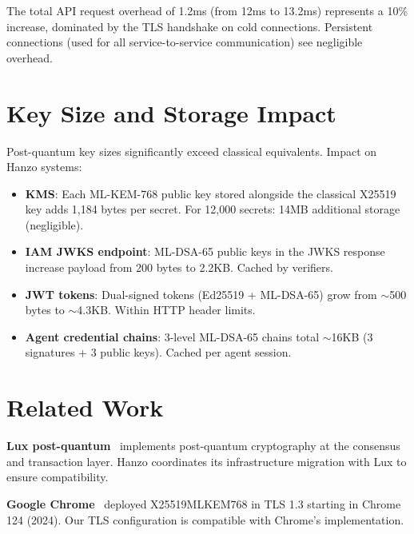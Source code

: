 \documentclass[11pt]{article}
\begin{document}
The total API request overhead of 1.2ms (from 12ms to 13.2ms) represents a
10\% increase, dominated by the TLS handshake on cold connections. Persistent
connections (used for all service-to-service communication) see negligible
overhead.

\section{Key Size and Storage Impact}
\label{sec:storage}

Post-quantum key sizes significantly exceed classical equivalents. Impact on
Hanzo systems:
\begin{itemize}[leftmargin=1.1em]
    \item \textbf{KMS}: Each ML-KEM-768 public key stored alongside the
    classical X25519 key adds 1,184 bytes per secret. For 12,000 secrets:
    14MB additional storage (negligible).
    \item \textbf{IAM JWKS endpoint}: ML-DSA-65 public keys in the JWKS
    response increase payload from 200 bytes to 2.2KB. Cached by verifiers.
    \item \textbf{JWT tokens}: Dual-signed tokens (Ed25519 + ML-DSA-65) grow
    from $\sim$500 bytes to $\sim$4.3KB. Within HTTP header limits.
    \item \textbf{Agent credential chains}: 3-level ML-DSA-65 chains total
    $\sim$16KB (3 signatures + 3 public keys). Cached per agent session.
\end{itemize}

\section{Related Work}
\label{sec:related}

\textbf{Lux post-quantum}~\cite{luxwhitepaper} implements post-quantum
cryptography at the consensus and transaction layer. Hanzo coordinates its
infrastructure migration with Lux to ensure compatibility.

\textbf{Google Chrome}~\cite{chromepq} deployed X25519MLKEM768 in TLS 1.3
starting in Chrome 124 (2024). Our TLS configuration is compatible with
Chrome's implementation.
\end{document}
